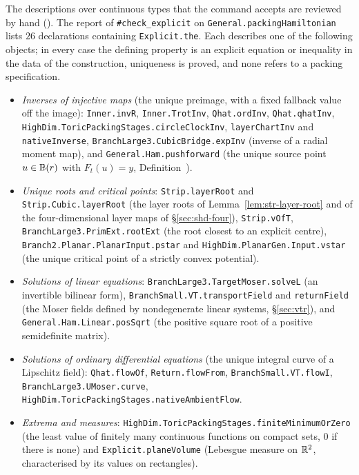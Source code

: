 The descriptions over continuous types that the command accepts are reviewed by hand (). The report of
\texttt{\#check\_explicit} on \texttt{General.packingHamiltonian} lists $26$ declarations containing
\texttt{Explicit.the}. Each describes one of the following objects; in every case the defining property is an
explicit equation or inequality in the data of the construction, uniqueness is proved, and none refers to a packing
specification.
\begin{itemize}
\item \emph{Inverses of injective maps} (the unique preimage, with a fixed fallback value off the image):
 \texttt{Inner.invR}, \texttt{Inner.TrotInv}, \texttt{Qhat.ordInv}, \texttt{Qhat.qhatInv},
 \texttt{HighDim.ToricPackingStages.circleClockInv}, \texttt{layerChartInv} and \texttt{nativeInverse},
 \texttt{BranchLarge3.CubicBridge.expInv} (inverse of a radial moment map), and \texttt{General.Ham.pushforward}
 (the unique source point $u\in\mathbb{B}(r)$ with $F_t(u)=y$, Definition~).
\item \emph{Unique roots and critical points}: \texttt{Strip.layerRoot} and \texttt{Strip.Cubic.layerRoot} (the layer roots
 of Lemma~\ref{lem:str-layer-root} and of the four-dimensional layer maps of \S\ref{sec:shd-four}), \texttt{Strip.vOfT}, \texttt{BranchLarge3.PrimExt.rootExt} (the
 root closest to an explicit centre), \texttt{Branch2.Planar.PlanarInput.pstar} and
 \texttt{HighDim.PlanarGen.Input.vstar} (the unique critical point of a strictly convex potential).
\item \emph{Solutions of linear equations}: \texttt{BranchLarge3.TargetMoser.solveL} (an invertible bilinear form),
 \texttt{BranchSmall.VT.transportField} and \texttt{returnField} (the Moser fields defined by nondegenerate linear
 systems, \S\ref{sec:vtr}), and \texttt{General.Ham.Linear.posSqrt} (the positive square root of a positive
 semidefinite matrix).
\item \emph{Solutions of ordinary differential equations} (the unique integral curve of a Lipschitz field):
 \texttt{Qhat.flowOf}, \texttt{Return.flowFrom}, \texttt{BranchSmall.VT.flowI}, \texttt{BranchLarge3.UMoser.curve},
 \texttt{HighDim.ToricPackingStages.nativeAmbientFlow}.
\item \emph{Extrema and measures}: \texttt{HighDim.ToricPackingStages.finiteMinimumOrZero} (the least value of finitely
 many continuous functions on compact sets, $0$ if there is none) and \texttt{Explicit.planeVolume} (Lebesgue measure
 on $\mathbb{R}^2$, characterised by its values on rectangles).
\end{itemize}

